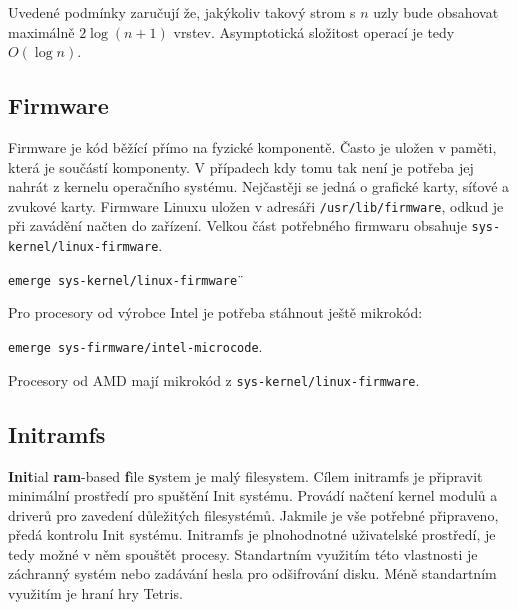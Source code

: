 \documentclass[12pt,a4paper,twoside,]{article}
\begin{document}
{Uvedené podmínky zaručují že, jakýkoliv takový strom s $n$ uzly bude obsahovat maximálně $2\log(n+1)$ vrstev. Asymptotická složitost operací je tedy $O(\log n)$.\\


\subsection{\textsf{Firmware}}

Firmware je kód běžící přímo na fyzické komponentě. Často je uložen v paměti, která je součástí komponenty. V případech kdy tomu tak není je potřeba jej nahrát z kernelu operačního systému. Nejčastěji se jedná o grafické karty, síťové a zvukové karty. 
Firmware Linuxu uložen v adresáři \texttt{/usr/lib/firmware}, odkud je při zavádění načten do zařízení. Velkou část potřebného firmwaru obsahuje \texttt{sys-kernel/linux-firmware}. 

\texttt{emerge sys-kernel/linux-firmware}¨

Pro procesory od výrobce Intel je potřeba stáhnout ještě mikrokód:

\texttt{emerge sys-firmware/intel-microcode}. 

Procesory od AMD mají mikrokód z \texttt{sys-kernel/linux-firmware}.
\subsection{\textsf{Initramfs}}
{\bf Init}ial {\bf ram}-based {\bf f}ile {\bf s}ystem je malý filesystem. Cílem initramfs je připravit minimální prostředí pro spuštění Init systému. Provádí načtení kernel modulů a driverů pro zavedení důležitých filesystémů. Jakmile je vše potřebné připraveno, předá kontrolu Init systému.
Initramfs je plnohodnotné uživatelské prostředí, je tedy možné v něm spouštět procesy. Standartním využitím této vlastnosti je záchranný systém nebo zadávání hesla pro odšifrování disku. Méně standartním využitím je hraní hry Tetris. 

}
\end{document}
